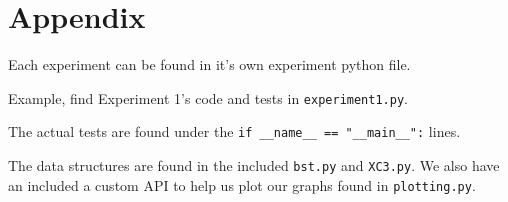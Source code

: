 \documentclass{article}
\begin{document}

\section{Appendix}

Each experiment can be found in it's own experiment python file. 

Example, find Experiment 1's code and tests in \verb|experiment1.py|.

The actual tests are found under the \verb|if __name__ == "__main__":| lines.

The data structures are found in the included \verb|bst.py| and \verb|XC3.py|. We also have an included a custom API to help us plot our graphs found in \verb|plotting.py|.
\end{document}
